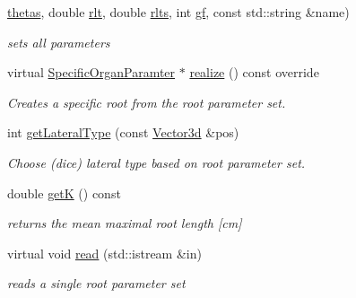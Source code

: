 \begin{DoxyCompactItemize}
\hyperlink{classCPlantBox_1_1StemRandomOrganParameter_acfbc9c8726805117a0263a003fd7e92c}{thetas}, double \hyperlink{classCPlantBox_1_1StemRandomOrganParameter_a30a9896019f04a7e7c8dd6a1cc981d6a}{rlt}, double \hyperlink{classCPlantBox_1_1StemRandomOrganParameter_a7ab136297d276f84895eee2fe33e8641}{rlts}, int \hyperlink{classCPlantBox_1_1StemRandomOrganParameter_a585bdb4319eb12a34240375230b332b9}{gf}, const std\+::string \&name)
\begin{DoxyCompactList}\small\item\em sets all parameters \end{DoxyCompactList}\item 
virtual \hyperlink{classCPlantBox_1_1SpecificOrganParamter}{Specific\+Organ\+Paramter} $\ast$ \hyperlink{classCPlantBox_1_1StemRandomOrganParameter_a85f065cc05841ede1bbad76065988dfb}{realize} () const override
\begin{DoxyCompactList}\small\item\em Creates a specific root from the root parameter set. \end{DoxyCompactList}\item 
int \hyperlink{classCPlantBox_1_1StemRandomOrganParameter_a47497b8ac2a56f559f5fd9ff171741b1}{get\+Lateral\+Type} (const \hyperlink{classCPlantBox_1_1Vector3d}{Vector3d} \&pos)
\begin{DoxyCompactList}\small\item\em Choose (dice) lateral type based on root parameter set. \end{DoxyCompactList}\item 
\mbox{\label{classCPlantBox_1_1StemRandomOrganParameter_a77985368e4851757dea91fcc4d0183fd}} 
double \hyperlink{classCPlantBox_1_1StemRandomOrganParameter_a77985368e4851757dea91fcc4d0183fd}{getK} () const
\begin{DoxyCompactList}\small\item\em returns the mean maximal root length \mbox{[}cm\mbox{]} \end{DoxyCompactList}\item 
\mbox{\label{classCPlantBox_1_1StemRandomOrganParameter_af6d88daff1bb30a176711f19e27367f4}} 
virtual void \hyperlink{classCPlantBox_1_1StemRandomOrganParameter_af6d88daff1bb30a176711f19e27367f4}{read} (std\+::istream \&in)
\begin{DoxyCompactList}\small\item\em reads a single root parameter set \end{DoxyCompactList}\item 

\end{DoxyCompactItemize}
